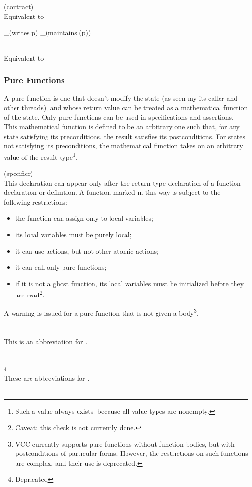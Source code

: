 \documentclass[preprint,nocopyrightspace]{sigplanconf}
\begin{document}
{{{\begin{VCC}
 (contract)\\
Equivalent to
\begin{VCC}
  _(writes p)
  _(maintains \mutable(p))
\end{VCC}

\\
Equivalent to 

\subsubsection{Pure Functions}
A pure function is one that doesn't modify the state (as seen my its
caller and other threads), and whose return value can be treated as a
mathematical function of the state. Only pure functions can be used in
specifications and assertions. This mathematical function is defined
to be an arbitrary one such that, for any state satisfying its
preconditions, the result satisfies its postconditions. For states not
satisfying its preconditions, the mathematical function takes on an
arbitrary value of the result type\footnote{Such a value always exists,
because all value types are nonempty.}.

 (specifier)\\
This declaration can appear only after the return type declaration of
a function declaration or definition. A function marked in this way is
subject to the following restrictions:
\begin{itemize}
\item the function can assign only to local variables;
\item its local variables must be purely local;
\item it can use  actions, but not other atomic actions;
\item it can call only pure functions;
\item if it is not a ghost function, its local variables must be
initialized before they are read\footnote{Caveat: this check is not
currently done.}.
\end{itemize}

A warning is issued for a pure function that is not given a
body\footnote{
VCC currently supports pure functions without function
bodies, but with postconditions of particular forms. However, the
restrictions on such functions are complex, and their use is
deprecated.
}.
\\\\
\\
This is an abbreviation for 
.
\\\\
\\
\footnote{Depricated}\\
These are abbreviations for . 
\\\\

\end{VCC}}}}
\end{document}
